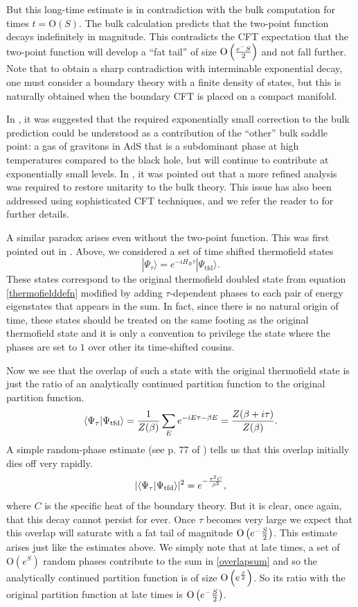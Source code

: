 \documentclass[12pt]{article}
\newcommand{\tfd}{\Psi_{\text{tfd}}} %
\newcommand{\tfdtau}{\Psi_{\tau}} %
\def\Or[#1]{{\text{O}}\left({#1}\right)}
\newcommand{\be}{\begin{equation}}
\newcommand{\ee}{\end{equation}}
\begin{document}
But this long-time estimate is in contradiction with the bulk computation for times $t = \Or[S]$. The bulk calculation predicts that the two-point function decays indefinitely in magnitude. This contradicts the CFT expectation that the  two-point function will develop a ``fat tail'' of size $\Or[e^{-S \over 2}]$ and not fall further.  Note that to obtain a sharp contradiction with interminable exponential decay, one must consider a boundary theory with a finite density of states, but this is naturally obtained when the boundary CFT is placed on a compact manifold.

In  \cite{Maldacena:2001kr}, it was suggested that the required exponentially small correction to the bulk prediction  could be understood as a contribution of the ``other'' bulk saddle point:  a gas of gravitons in AdS that is a subdominant phase at high temperatures compared to the black hole, but will continue to contribute at exponentially small levels. In \cite{Barbon:2004ce,Barbon:2003aq}, it was pointed out that a more refined analysis was required to restore unitarity to the bulk theory. This issue has also been addressed using sophisticated CFT techniques, and we refer the reader to \cite{Fitzpatrick:2016mjq,Chen:2016cms,Anous:2016kss} for further details.


A similar paradox arises even without the two-point function. This was first pointed out in \cite{Papadodimas:2015xma}. Above, we considered a set of time shifted thermofield states
\be
|\tfdtau \rangle = e^{-i H_R \tau} |\tfd \rangle.
\ee
These states correspond to the original thermofield doubled state from equation \eqref{thermofielddefn} modified by adding $\tau$-dependent phases to each pair of energy eigenstates that appears in the sum. In fact, since
there is no natural origin of time, these states should be treated on the same footing as the original thermofield state and it is only a convention to privilege the state where the phases are set to $1$ over other its time-shifted cousins.

Now we see that the overlap of such a state with the original thermofield state is just the ratio of an analytically continued partition function to the original partition function.
\be
\label{overlapsum}
\langle \tfdtau | \tfd \rangle = {1 \over Z(\beta)} \sum_{E} e^{-i E \tau - {\beta E}} = {Z(\beta + i \tau) \over Z(\beta)}.
\ee
A simple random-phase estimate (see p. 77 of \cite{Papadodimas:2015jra}) tells us that this overlap initially dies off very rapidly.
\be
\label{innerprod}
|\langle \tfdtau|  \tfd \rangle |^2 =  e^{-{\tau^2 C \over \beta^2}},
\ee
where $C$ is the specific heat of the boundary theory. But it is clear, once again, that this decay cannot persist for ever. Once $\tau$ becomes very large we expect that this overlap will saturate with a fat tail of magnitude $\Or[e^{-{S \over 2}}]$. This estimate arises just like the estimates above. We simply  note that at late times, a set of $\Or[e^{S}]$ random phases contribute to the sum in \eqref{overlapsum} and so the analytically continued partition function is of size $\Or[e^{{S \over 2}}]$. So its ratio with the original partition function at late times is $\Or[e^{-{S \over 2}}]$.
\end{document}
